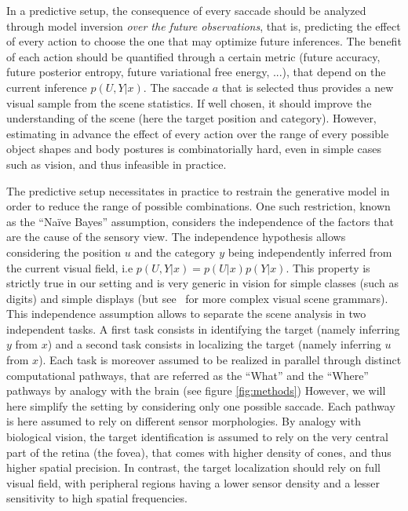 In a predictive setup, the consequence of every saccade should be analyzed through model inversion \emph{over the future observations}, that is, predicting the effect of every action to choose the one that may optimize future inferences. The benefit of each action should be quantified through a certain metric (future accuracy, future posterior entropy, future variational free energy, ...), that depend on the current inference $p(U,Y|x)$. The saccade $a$ that is selected thus provides a new visual sample from the scene statistics. If well chosen, it should improve the understanding of the scene (here the target position and category). However, estimating in advance the effect of every action over the range of every possible object shapes and body postures is combinatorially hard, even in simple cases such as vision, and thus infeasible in practice.

The predictive setup necessitates in practice to restrain the generative model in order to reduce the range of possible combinations. One such restriction, known as the ``Naïve Bayes'' assumption, considers the independence of the factors that are the cause of the sensory view.
The independence hypothesis allows considering the position $u$ and the category $y$ being independently inferred from the current visual field, i.e $p(U,Y|x) = p(U|x) p(Y|x)$. This property is strictly true in our setting and is very generic in vision for simple classes (such as digits) and simple displays (but see~\citep{Vo12} for more complex visual scene grammars).
%
This independence assumption allows to separate the scene analysis in two independent tasks. A first task consists in identifying the target (namely inferring $y$ from $x$) and a second task consists in localizing the target (namely inferring $u$ from $x$). Each task is moreover assumed to be realized in parallel through distinct computational pathways, that are referred as the
``What'' and the ``Where'' pathways by analogy with the brain (see figure \ref{fig:methods})
However, we will here simplify the setting by considering only one possible saccade.
Each pathway is here assumed to rely on different sensor morphologies. By analogy with biological vision, the target identification is assumed to rely on the very central part of the retina (the fovea), that comes with higher density of cones, and thus higher spatial precision. In contrast, the target localization should rely on full visual field, with peripheral regions having a lower sensor density and a lesser sensitivity to high spatial frequencies.

